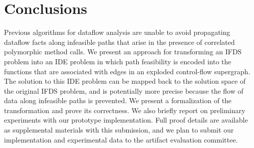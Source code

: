 \section{Conclusions}
  \label{sec:Conclusions}
  
Previous algorithms for dataflow analysis are unable to avoid propagating
dataflow facts along infeasible paths that arise in the presence of
correlated polymorphic method calls. 
% 
We present an approach for transforming an IFDS problem into an IDE problem
in which path feasibility is encoded into the functions that are associated
with edges in an exploded control-flow supergraph. The solution to this
IDE problem can be mapped back to the solution space of the original IFDS
problem, and is potentially more precise because the flow of data along
infeasible paths is prevented. We present a formalization of the
transformation and prove its correctness. We also briefly report on
preliminary experiments with our prototype implementation. Full proof
details are available as supplemental materials with this submission,
and we plan to submit our implementation and experimental data to the
artifact evaluation committee. 
  

